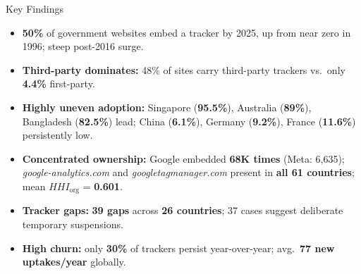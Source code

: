   \begin{block}{Key Findings}

    \begin{itemize}
      \item \textbf{50\%} of government websites embed a tracker by 2025, up from near zero in 1996; steep post-2016 surge.
      \item \textbf{Third-party dominates:} 48\% of sites carry third-party trackers vs.\ only \textbf{4.4\%} first-party.
      \item \textbf{Highly uneven adoption:} Singapore (\textbf{95.5\%}), Australia (\textbf{89\%}), Bangladesh (\textbf{82.5\%}) lead; China (\textbf{6.1\%}), Germany (\textbf{9.2\%}), France (\textbf{11.6\%}) persistently low.
      \item \textbf{Concentrated ownership:} Google embedded \textbf{68K times} (Meta: 6,635); \emph{google-analytics.com} and \emph{googletagmanager.com} present in \textbf{all 61 countries}; mean $HHI_{\mathrm{org}}$ = \textbf{0.601}.
      \item \textbf{Tracker gaps:} \textbf{39 gaps} across \textbf{26 countries}; 37 cases suggest deliberate temporary suspensions.
      \item \textbf{High churn:} only \textbf{30\%} of trackers persist year-over-year; avg.\ \textbf{77 new uptakes/year} globally.
    \end{itemize}

  \end{block}
